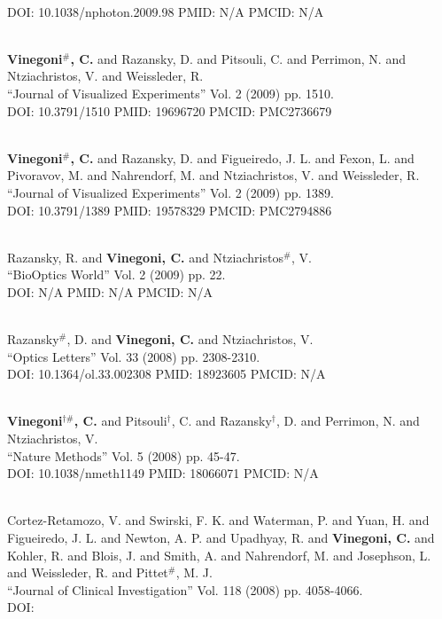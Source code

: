 \\ DOI: 10.1038/nphoton.2009.98 PMID: N/A PMCID: N/A\item {} \\ {\bf Vinegoni$^\#$, C.} and Razansky, D. and Pitsouli, C. and Perrimon, N. and Ntziachristos, V. and Weissleder, R. \\ ``Journal of Visualized Experiments'' Vol. 2 (2009) pp. 1510. \\ DOI: 10.3791/1510 PMID: 19696720 PMCID: PMC2736679\item {} \\ {\bf Vinegoni$^\#$, C.} and Razansky, D. and Figueiredo, J. L. and Fexon, L. and Pivoravov, M. and Nahrendorf, M. and Ntziachristos, V. and Weissleder, R. \\ ``Journal of Visualized Experiments'' Vol. 2 (2009) pp. 1389. \\ DOI: 10.3791/1389 PMID: 19578329 PMCID: PMC2794886\item {} \\ Razansky, R. and {\bf Vinegoni, C.} and Ntziachristos$^\#$, V. \\ ``BioOptics World'' Vol. 2 (2009) pp. 22. \\ DOI: N/A PMID: N/A PMCID: N/A\item {} \\ Razansky$^\#$, D. and {\bf Vinegoni, C.} and Ntziachristos, V. \\ ``Optics Letters'' Vol. 33 (2008) pp. 2308-2310. \\ DOI: 10.1364/ol.33.002308 PMID: 18923605 PMCID: N/A\item {} \\ {\bf Vinegoni$^{\dag \#}$, C.} and Pitsouli$^\dag$, C. and Razansky$^\dag$, D. and Perrimon, N. and Ntziachristos, V. \\ ``Nature Methods'' Vol. 5 (2008) pp. 45-47. \\ DOI: 10.1038/nmeth1149 PMID: 18066071 PMCID: N/A\item {} \\ Cortez-Retamozo, V. and Swirski, F. K. and Waterman, P. and Yuan, H. and Figueiredo, J. L. and Newton, A. P. and Upadhyay, R. and {\bf Vinegoni, C.} and Kohler, R. and Blois, J. and Smith, A. and Nahrendorf, M. and Josephson, L. and Weissleder, R. and Pittet$^\#$, M. J. \\ ``Journal of Clinical Investigation'' Vol. 118 (2008) pp. 4058-4066. \\ DOI: 